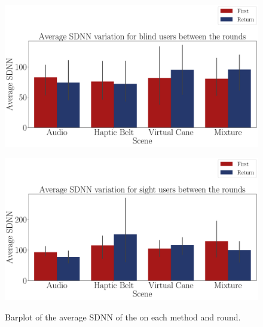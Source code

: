 \begin{figure}[!htpb]
    \centering
    \begin{minipage}{\textwidth}
        \centering
        \includegraphics[width = \textwidth]{Resultados/ECG/Figuras/pdf/barplot_ecg_sdnn_4_scene_blind.pdf}
        \label{fig:barplot_ecg_sdnn_4_scene_blind}
    \end{minipage}
    \begin{minipage}{\textwidth}
        \centering
        \includegraphics[width = \textwidth]{Resultados/ECG/Figuras/pdf/barplot_ecg_sdnn_4_scene_sight.pdf}
        \label{fig:barplot_ecg_sdnn_4_scene_sight}
    \end{minipage}
    \caption{Barplot of the average SDNN of the on each method and round.}
    \label{fig:barplot_ecg_sdnn_4_scene_blind_sight}
\end{figure}

